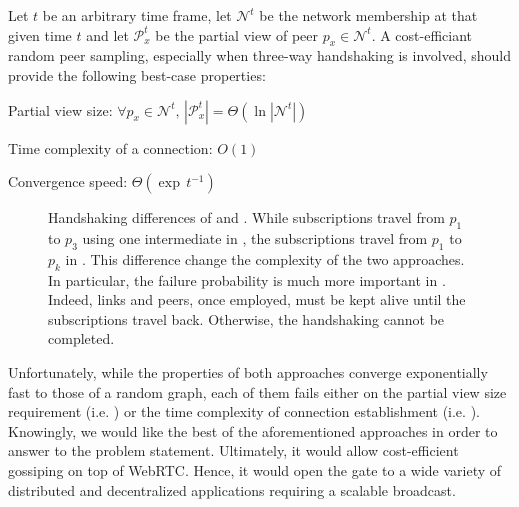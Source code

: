 \begin{problem}
  Let $t$ be an arbitrary time frame, let $\mathcal{N}^t$ be the network
  membership at that given time $t$ and let $\mathcal{P}_x^t$ be the partial view of peer $p_x \in \mathcal{N}^t$. 
  A cost-efficiant random peer sampling, especially when three-way handshaking is
  involved, should provide the following best-case properties:
  \begin{center}
    Partial view size: \hfill
    $\forall p_x \in \mathcal{N}^t,\, |\mathcal{P}_x^t| = \Theta (\ln
    |\mathcal{N}^t|)$
  \end{center}
  \begin{center}
    Time complexity of a connection: \hfill $O(1)$
  \end{center}
  \begin{center}
    Convergence speed: \hfill $\Theta(\exp \, t^{-1})$
  \end{center}
\end{problem}

\begin{figure}
  \centering
  
  \caption{\label{fig:handshakeexample}Handshaking differences of \CYCLON{} and
    \SCAMP{}. While subscriptions travel from $p_1$ to $p_3$ using one
    intermediate in \CYCLON{}, the subscriptions travel from $p_1$ to $p_k$ in
    \SCAMP{}. This difference change the complexity of the two approaches. In
    particular, the failure probability is much more important in
    \SCAMP{}. Indeed, links and peers, once employed, must be kept alive until
    the subscriptions travel back. Otherwise, the handshaking cannot be
    completed.}
\end{figure}

Unfortunately, while the properties of both approaches converge exponentially fast
to those of a random graph, each of them fails either on the partial view size requirement
(i.e. \CYCLON{}) or the time complexity of connection establishment
(i.e. \SCAMPLON{}). Knowingly, we would like the best of the aforementioned
approaches in order to answer to the problem statement. Ultimately, it would
allow cost-efficient gossiping on top of WebRTC. Hence, it would open the gate to a wide
variety of distributed and decentralized applications requiring a scalable
broadcast.

